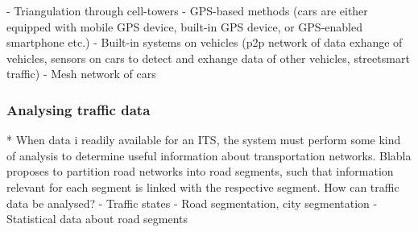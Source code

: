 - Triangulation through cell-towers
- GPS-based methods (cars are either equipped with mobile GPS device, built-in GPS device, or GPS-enabled smartphone etc.) 
- Built-in systems on vehicles (p2p network of data exhange of vehicles, sensors on cars to detect and exhange data of other vehicles, streetsmart traffic)
- Mesh network of cars

\subsubsection*{Analysing traffic data}*
When data i readily available for an ITS, the system must perform some kind of analysis to determine useful information about transportation networks. Blabla proposes to partition road networks into road segments, such that information relevant for each segment is linked with the respective segment. 
How can traffic data be analysed?
- Traffic states
- Road segmentation, city segmentation
- Statistical data about road segments 